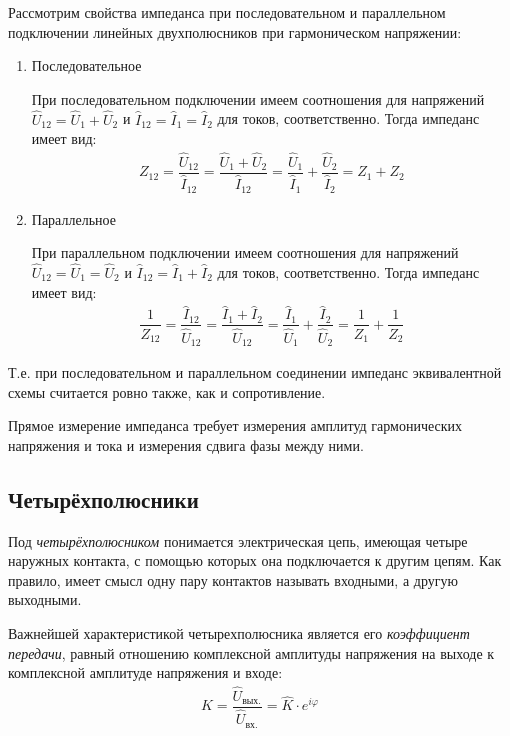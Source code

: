 \documentclass[a4paper, usenames, dvipsnames]{article}
\begin{document}
Рассмотрим свойства импеданса при последовательном и параллельном подключении линейных двухполюсников
при гармоническом напряжении:
\begin{enumerate}
    \item Последовательное

          При последовательном подключении имеем соотношения для напряжений $\hat{U}_{12} = \hat{U}_1 + \hat{U}_2$
          и $\hat{I}_{12} = \hat{I}_1 = \hat{I}_2$ для токов, соответственно.
          Тогда импеданс имеет вид:
          \begin{gather*}
              Z_{12} = \dfrac{\hat{U}_{12}}{\hat{I}_{12}} = \dfrac{\hat{U}_1 + \hat{U}_2}{\hat{I}_{12}} = \dfrac{\hat{U}_1}{\hat{I}_1} + \dfrac{\hat{U}_2}{\hat{I}_2} = Z_1 + Z_2
          \end{gather*}
    \item Параллельное

          При параллельном подключении имеем соотношения для напряжений $\hat{U}_{12} = \hat{U}_1 = \hat{U}_2$
          и $\hat{I}_{12} = \hat{I}_1 + \hat{I}_2$ для токов, соответственно.
          Тогда импеданс имеет вид:
          \begin{gather*}
              \dfrac{1}{Z_{12}} = \dfrac{\hat{I}_{12}}{\hat{U}_{12}} = \dfrac{\hat{I}_1 + \hat{I}_2}{\hat{U}_{12}} = \dfrac{\hat{I}_1}{\hat{U}_1} + \dfrac{\hat{I}_2}{\hat{U}_2} = \dfrac{1}{Z_1} + \dfrac{1}{Z_2}
          \end{gather*}
\end{enumerate}
Т.е. при последовательном и параллельном соединении импеданс эквивалентной схемы считается ровно также,
как и сопротивление.

Прямое измерение импеданса требует измерения амплитуд гармонических напряжения и тока
и измерения сдвига фазы между ними.

\subsection*{Четырёхполюсники}

Под {\it четырёхполюсником} понимается электрическая цепь,
имеющая четыре наружных контакта,
с помощью которых она подключается к другим цепям.
Как правило, имеет смысл одну пару контактов называть входными,
а другую выходными.

Важнейшей характеристикой четырехполюсника является его {\it коэффициент передачи},
равный отношению комплексной амплитуды напряжения на выходе к комплексной
амплитуде напряжения и входе:
\begin{gather*}
    K = \dfrac{\hat{U}_\text{вых.}}{\hat{U}_\text{вх.}} = \hat{K} \cdot e^{i\varphi}
\end{gather*}
\end{document}
